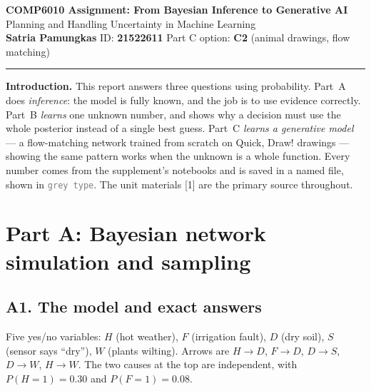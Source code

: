 \documentclass[12pt,a4paper]{article}
\newcommand{\file}[1]{\textcolor{gray}{\small\texttt{#1}}}
\begin{document}
\pagestyle{plain}

\begin{center}
{\large\bfseries COMP6010 Assignment: From Bayesian Inference to Generative AI}\\[1pt]
{\small Planning and Handling Uncertainty in Machine Learning}\\[2pt]
{\bfseries Satria Pamungkas} \quad\textbullet\quad ID: {\bfseries 21522611}
\quad\textbullet\quad Part C option: {\bfseries C2} (animal drawings, flow matching)
\end{center}
\vspace{-3pt}\hrule\vspace{2pt}

\noindent\textbf{Introduction.} This report answers three questions using probability. Part~A does
\emph{inference}: the model is fully known, and the job is to use evidence correctly. Part~B \emph{learns}
one unknown number, and shows why a decision must use the whole posterior instead of a single best guess.
Part~C \emph{learns a generative model} --- a flow-matching network trained from scratch on Quick, Draw!
drawings --- showing the same pattern works when the unknown is a whole function. Every number comes from
the supplement's notebooks and is saved in a named file, shown in \file{grey type}. The unit materials [1]
are the primary source throughout.

\section{Part A: Bayesian network simulation and sampling}

\subsection{A1. The model and exact answers}

Five yes/no variables: $H$ (hot weather), $F$ (irrigation fault), $D$ (dry soil), $S$ (sensor says
``dry''), $W$ (plants wilting). Arrows are $H\!\to\!D$, $F\!\to\!D$, $D\!\to\!S$, $D\!\to\!W$,
$H\!\to\!W$. The two causes at the top are independent, with $P(H{=}1)=0.30$ and $P(F{=}1)=0.08$.
\end{document}
